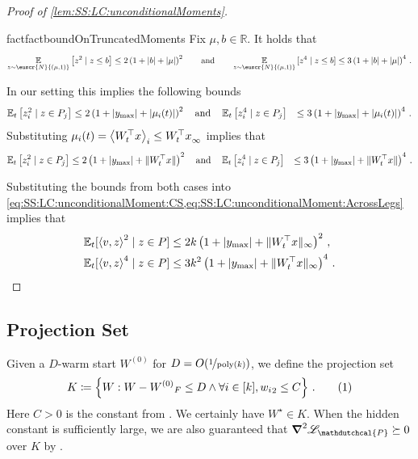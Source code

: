 \documentclass[11pt,letterpaper]{article}
\theoremstyle{plain}
\theoremstyle{definition}
\theoremstyle{remark}
\newcommand{\yesnum}{\addtocounter{equation}{1}\tag{\theequation}}
\newcommand{\quadtext}[1]{\quad\text{#1}\quad}
\newcommand{\qquadtext}[1]{\qquad\text{#1}\qquad}
\newcommand{\quadand}{\quadtext{and}}
\newcommand{\qquadand}{\qquadtext{and}}
\def\abs#1{\left| #1 \right|}
\newcommand{\sinsquare}[1]{\ensuremath{[#1]}}
\newcommand{\inbrace}[1]{\ensuremath{\left\{#1\right\}}}
\newcommand{\inparen}[1]{\ensuremath{\left(#1\right)}}
\newcommand{\insquare}[1]{\ensuremath{\left[#1\right]}}
\newcommand{\inangle}[1]{\left\langle#1\right\rangle}
\newcommand{\snorm}[1]{\ensuremath{\ensuremath{\| #1 \|}}}
\let\norm\relax
\newcommand{\norm}[1]{\ensuremath{\left\lVert #1 \right\rVert}}
\newcommand{\R}{\mathbb{R}}
\newcommand{\E}{\operatornamewithlimits{\mathbb{E}}}
\newcommand{\Ex}{\E}
\newcommand{\nfrac}[2]{\nicefrac{#1}{#2}}
\newcommand{\poly}{\mathrm{poly}}
\newcommand{\customcal}[1]{\euscr{#1}}
\newcommand{\cN}{\customcal{N}}
\newcommand{\negLL}{\ensuremath{\mathscr{L}}}
\newcommand{\hypo}[1]{\mathdutchcal{#1}}
\newcommand{\hyP}{\hypo{P}}
\newcommand{\normal}[2]{\cN{\inparen{#1,#2}}}
\newcommand{\ymax}{y_{\max}}
\begin{document}
{{\begin{proof}[Proof of \cref{lem:SS:LC:unconditionalMoments}]
\begin{enumerate}
                \begin{restatable}[]{fact}{factboundOnTruncatedMoments}
                    \label{fact:SS:LC:boundOnTruncatedMoments}
                    Fix $\mu,b\in \R$. It holds that 
                    \[
                        \Ex_{z\sim \normal{\mu}{1}}\insquare{z^2\mid z\leq b}
                        \leq 2\inparen{1+\abs{b}+\abs{\mu}}^2
                        \qquadand
                        \Ex_{z\sim \normal{\mu}{1}}\insquare{z^{\smash{4}}\mid z\leq b}
                        \leq 3\inparen{1+\abs{b}+\abs{\mu}}^4\,.
                    \]
                \end{restatable} 
                In our setting this implies the following bounds
                \begin{align*}
                    \Ex\nolimits_{t}\insquare{z_i^2 \mid z\in P_j} &\leq 
                        2 \inparen{1 + \abs{\ymax} + \abs{\mu_i(t)}}^2
                    \quadand
                    \Ex\nolimits_{t}\insquare{z_i^4 \mid z\in P_j} &\leq 
                        3 \inparen{1 + \abs{\ymax} + \abs{\mu_i(t)}}^4\,.
                \end{align*}
                Substituting $\mu_i(t)=\inangle{W_t^\top x}_i\leq \norm{W_t^\top x}_\infty$ implies that 
                \begin{align*}
                    \Ex\nolimits_{t}\insquare{z_i^2 \mid z\in P_j} &\leq 
                        2 \inparen{1 + \abs{\ymax} + \snorm{W_t^\top x}}^2
                    \quadand
                    \Ex\nolimits_{t}\insquare{z_i^4 \mid z\in P_j} &\leq 
                        3 \inparen{1 + \abs{\ymax} + \snorm{W_t^\top x}}^4\,.
                \end{align*} 
            \end{enumerate}
            Substituting the bounds from both cases into \cref{eq:SS:LC:unconditionalMoment:CS,eq:SS:LC:unconditionalMoment:AcrossLegs} implies that 
            \begin{align*}
                 \Ex\nolimits_{t}\sinsquare{\inangle{v,z}^2\mid z\in P} &\leq 
                 2k\inparen{1 + \abs{\ymax} + \snorm{W_t^\top x}_\infty}^2\,,\\\Ex\nolimits_{t}\sinsquare{\inangle{v,z}^4\mid z\in P} &\leq 
                 3k^2\inparen{1 + \abs{\ymax} + \snorm{W_t^\top x}_\infty}^4\,.
            \end{align*}
        \end{proof}

        
\subsection{Projection Set}
Given a $D$-warm start $W^{(0)}$ for $D = O(\nfrac1{\poly(k)})$,
we define the projection set
\[
    K\coloneqq \inbrace{W: \norm{W-W^{(0)}}_F\leq D\land \forall i\in [k], \norm{w_i}_2\leq C}\,.
    \yesnum\label{eq:SS:projectionSet}
\]
Here $C>0$ is the constant from .
We certainly have $W^\star\in K$.
When the hidden constant is sufficiently large,
we are also guaranteed that $\grad^2\negLL_\hyP \succeq 0$ over $K$ by .

}}
\end{document}

